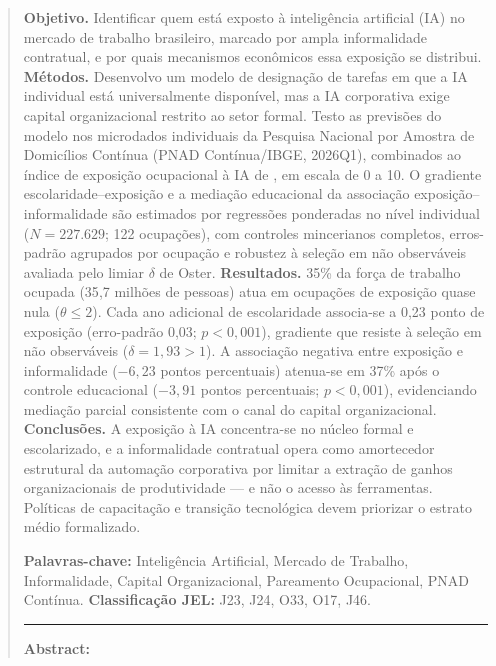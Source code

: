 \begin{abstract}
\noindent
\textbf{Objetivo.} Identificar quem está exposto à inteligência artificial (IA) no mercado de trabalho brasileiro, marcado por ampla informalidade contratual, e por quais mecanismos econômicos essa exposição se distribui. \textbf{Métodos.} Desenvolvo um modelo de designação de tarefas em que a IA individual está universalmente disponível, mas a IA corporativa exige capital organizacional restrito ao setor formal. Testo as previsões do modelo nos microdados individuais da Pesquisa Nacional por Amostra de Domicílios Contínua (PNAD Contínua/IBGE, 2026Q1), combinados ao índice de exposição ocupacional à IA de \citet{eloundou2024gpts}, em escala de 0 a 10. O gradiente escolaridade--exposição e a mediação educacional da associação exposição--informalidade são estimados por regressões ponderadas no nível individual ($N = 227.629$; 122 ocupações), com controles mincerianos completos, erros-padrão agrupados por ocupação e robustez à seleção em não observáveis avaliada pelo limiar $\delta$ de Oster. \textbf{Resultados.} 35\% da força de trabalho ocupada (35{,}7 milhões de pessoas) atua em ocupações de exposição quase nula ($\theta \le 2$). Cada ano adicional de escolaridade associa-se a 0{,}23 ponto de exposição (erro-padrão 0{,}03; $p < 0{,}001$), gradiente que resiste à seleção em não observáveis ($\delta = 1{,}93 > 1$). A associação negativa entre exposição e informalidade ($-6{,}23$ pontos percentuais) atenua-se em 37\% após o controle educacional ($-3{,}91$ pontos percentuais; $p < 0{,}001$), evidenciando mediação parcial consistente com o canal do capital organizacional. \textbf{Conclusões.} A exposição à IA concentra-se no núcleo formal e escolarizado, e a informalidade contratual opera como amortecedor estrutural da automação corporativa por limitar a extração de ganhos organizacionais de produtividade --- e não o acesso às ferramentas. Políticas de capacitação e transição tecnológica devem priorizar o estrato médio formalizado.\par
\vspace{0.3em}
\noindent \textbf{Palavras-chave:} Inteligência Artificial, Mercado de Trabalho, Informalidade, Capital Organizacional, Pareamento Ocupacional, PNAD Contínua. \textbf{Classificação JEL:} J23, J24, O33, O17, J46.\par
\vspace{0.8em}
\noindent \rule{\linewidth}{0.4pt}\par
\vspace{0.8em}
\noindent \textbf{Abstract:}

\end{abstract}
